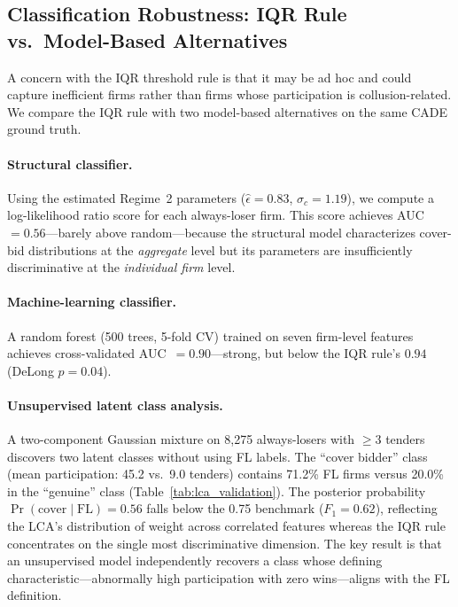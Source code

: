 
\subsection{Classification Robustness: IQR Rule vs.\ Model-Based Alternatives}
\label{sec:classification_robustness}

A concern with the IQR threshold rule is that it may be ad hoc and
could capture inefficient firms rather than firms whose participation
is collusion-related. We compare
the IQR rule with two model-based alternatives on the same CADE
ground truth.

\paragraph{Structural classifier.}
Using the estimated Regime~2 parameters ($\hat{\epsilon} = 0.83$,
$\hat{\sigma}_c = 1.19$), we compute a log-likelihood ratio score for
each always-loser firm. This score achieves AUC~$= 0.56$---barely
above random---because the structural model characterizes cover-bid
distributions at the \emph{aggregate} level but its parameters are
insufficiently discriminative at the \emph{individual firm} level.

\paragraph{Machine-learning classifier.}
A random forest (500 trees, 5-fold CV) trained on seven firm-level
features achieves cross-validated AUC~$= 0.90$---strong, but below
the IQR rule's $0.94$ (DeLong $p = 0.04$).

\paragraph{Unsupervised latent class analysis.}
A two-component Gaussian mixture on 8,275 always-losers with $\geq 3$
tenders discovers two latent classes without using FL labels. The
``cover bidder'' class (mean participation: 45.2 vs.\ 9.0 tenders)
contains 71.2\% FL firms versus 20.0\% in the ``genuine'' class
(Table~\ref{tab:lca_validation}). The posterior probability
$\Pr(\text{cover} \mid \text{FL}) = 0.56$ falls below the 0.75
benchmark ($F_1 = 0.62$), reflecting the LCA's distribution of weight
across correlated features whereas the IQR rule concentrates on the
single most discriminative dimension. The key result is that an
unsupervised model independently recovers a class whose defining
characteristic---abnormally high participation with zero
wins---aligns with the FL definition.

